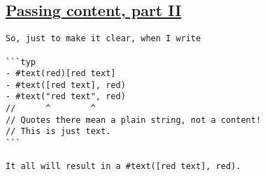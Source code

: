 \pandocbounded{}

\subsection{\texorpdfstring{\hyperref[passing-content-part-ii]{Passing
content, part
II}}{Passing content, part II}}\label{passing-content-part-ii}

\begin{verbatim}
So, just to make it clear, when I write

```typ
- #text(red)[red text]
- #text([red text], red)
- #text("red text", red)
//      ^        ^
// Quotes there mean a plain string, not a content!
// This is just text.
```

It all will result in a #text([red text], red).
\end{verbatim}

\pandocbounded{}
